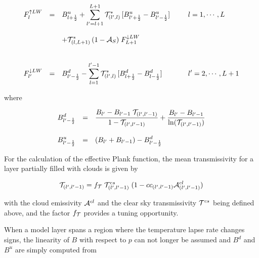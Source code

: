 \begin{equation}\label{vertical2}
\begin{array}{rclcl}
\displaystyle F_l^{\uparrow LW}& = &\displaystyle  B^u_{l+\frac{1}{2}} + 
\sum\limits_{l^\prime=l+1}^{L+1} {\cal T}^*_{(l^\prime ,
l)} \,
[B^u_{l^\prime+\frac{1}{2}} - B^u_{l^\prime-
\frac{1}{2}}] &  & \displaystyle \;\; l=1,  \cdots , L\\
&&&&\\
 & & \displaystyle + {\cal T}^*_{(l,L+1)} \, (1-{\cal A}_S) \; F_{L+1}^{\downarrow LW} & & \\
& & & &  \\
&&&&\\
\displaystyle F_{l^\prime}^{\downarrow LW}& = & \displaystyle
B^d_{l^\prime-
\frac{1}{2}} - \sum\limits_{l=1}^{l^\prime-1} {\cal T}^*_{(l^\prime , l)} \,
[B^d_{l+\frac{1}{2}}
-
B^d_{l-\frac{1}{2}}]
& & \displaystyle \;\; l^\prime=2,  \cdots , L+1
\end{array}
\end{equation}

where 

\begin{equation}
\begin{array}{lcl}
\displaystyle B^d_{l^{\prime}-\frac{1}{2}} & = & \displaystyle \frac{B_{l^{\prime}}-B_{l^{\prime}-1} \;
{\cal T}_{(l^{\prime},l^{\prime}-1)}}{1-{\cal T}_{(l^{\prime},l^{\prime}-1)}} +
\frac{B_{l^{\prime}} - B_{l^{\prime}-1}}{\ln({\cal T}_{(l^{\prime},l^{\prime}-1)})} \\
&& \\
\displaystyle B^u_{l^{\prime}-\frac{1}{2}} & = & \displaystyle (B_{l^{\prime}} + B_{l^{\prime}-1} ) -
B^d_{l^{\prime}-\frac{1}{2}}
\end{array}
\end{equation}

For the calculation of the effective Plank function, the mean transmissivity for a layer partially
filled with clouds is given by

\begin{equation}
{\cal T}_{(l^{\prime},l^{\prime}-1)} = f_{{\cal T}} \; {\cal
T}^{cs}_{(l^{\prime},l^{\prime}-1)} \; (1 - 
cc_{(l^{\prime},l^{\prime}-1)}{\cal A}^{cl}_{(l^{\prime},l^{\prime}-1)})
\end{equation}


with the cloud emissivity ${\cal A}^{cl}$ and the clear sky transmissivity ${\cal T}^{cs}$
being defined above, and the factor $f_{{\cal T}}$  provides a tuning opportunity.

When a model layer spans a region where the temperature lapse rate changes signs, the linearity
of $B$ with respect to $p$ can not longer be assumed and $B^d$ and $B^u$ are simply
computed from

